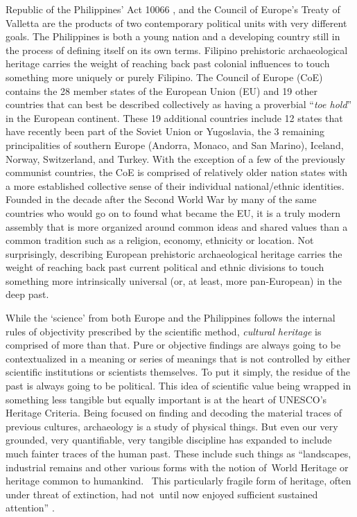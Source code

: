 Republic of the Philippines’ Act 10066 \parencite{RA10066}, and the Council of Europe’s Treaty of Valletta \parencite{Valletta_1992} are the products of two contemporary political units with very different goals. The Philippines is both a young nation and a developing country still in the process of defining itself on its own terms. 
Filipino prehistoric archaeological heritage carries the weight of reaching back past colonial influences to touch something more uniquely or purely Filipino. The Council of Europe (CoE) contains the 28 member states of the European Union (EU) and 19 other countries that can best be described collectively as having a proverbial “\textit{toe hold}” in the European continent. 
These 19 additional countries include 12 states that have recently been part of the Soviet Union or Yugoslavia, the 3 remaining principalities of southern Europe (Andorra, Monaco, and San Marino), Iceland, Norway, Switzerland, and Turkey.  With the exception of a few of the previously communist countries, the CoE is comprised of relatively older nation states with a more established collective sense of their individual national/ethnic identities. Founded in the decade after the Second World War by many of the same countries who would go on to found what became the EU, it is a truly modern assembly that is more organized around common ideas and shared values than a common tradition such as a religion, economy, ethnicity or location. Not surprisingly, describing European prehistoric archaeological heritage carries the weight of reaching back past current political and ethnic divisions to touch something more intrinsically universal (or, at least, more pan-European) in the deep past. 
 
While the ‘science’ from both Europe and the Philippines follows the internal rules of objectivity prescribed by the scientific method, \textit{cultural heritage} is comprised of more than that. Pure or objective findings are always going to be contextualized in a meaning or series of meanings that is not controlled by either scientific institutions or scientists themselves. To put it simply, the residue of the past is always going to be political. This idea of scientific value being wrapped in something less tangible but equally important is at the heart of UNESCO’s Heritage Criteria. Being focused on finding and decoding the material traces of previous cultures, archaeology is a study of physical things. But even our very grounded, very quantifiable, very tangible discipline has expanded to include much fainter traces of the human past. These include such things as “landscapes, industrial remains and other various forms with the notion of World Heritage or heritage common to humankind.  This particularly fragile form of heritage, often under threat of extinction, had not until now enjoyed sufficient sustained attention” \parencite{Cairo_2015}. 

